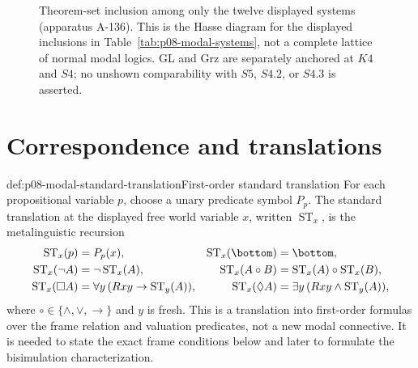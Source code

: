 \begin{figure}[!htbp]
\centering
{}
\caption{Theorem-set inclusion among only the twelve displayed systems
(apparatus A-136).  This is the Hasse diagram for the displayed inclusions in
Table~\ref{tab:p08-modal-systems}, not a complete lattice of normal modal
logics.  GL and Grz are separately anchored at \(K4\) and \(S4\); no unshown
comparability with \(S5\), \(S4.2\), or \(S4.3\) is asserted.}
\label{fig:p08-modal-lattice}
\end{figure}

\section{Correspondence and translations}

\begin{hbdefinition}{def:p08-modal-standard-translation}{First-order standard translation}
For each propositional variable \(p\), choose a unary predicate symbol
\(P_p\).  The standard translation at the displayed free world variable
\(x\), written \(\operatorname{ST}_x\), is the metalinguistic recursion
\[
\begin{aligned}
 \operatorname{ST}_x(p)&=P_p(x),
 &\operatorname{ST}_x(\bottom)&=\bottom,\\
 \operatorname{ST}_x(\neg A)&=\neg\operatorname{ST}_x(A),
 &\operatorname{ST}_x(A\circ B)&=
   \operatorname{ST}_x(A)\circ\operatorname{ST}_x(B),\\
 \operatorname{ST}_x(\Box A)&=
   \forall y\,(Rxy\to\operatorname{ST}_y(A)),
 &\operatorname{ST}_x(\Diamond A)&=
   \exists y\,(Rxy\land\operatorname{ST}_y(A)),
\end{aligned}
\]
where \(\circ\in\{\land,\lor,\to\}\) and \(y\) is fresh.  This is a
translation into first-order formulas over the frame relation and valuation
predicates, not a new modal connective.  It is needed to state the exact frame
conditions below and later to formulate the bisimulation characterization.
\end{hbdefinition}

